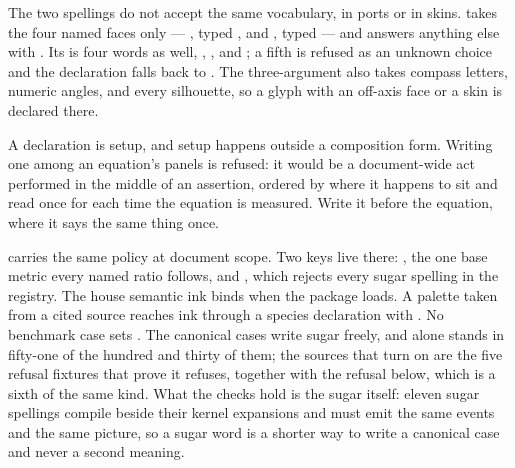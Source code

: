 \dbendpar The two spellings do not accept the same vocabulary, in ports
or in skins.   takes the four named faces only ---
,  typed , and ,
 typed  --- and answers anything else with
.  Its  is four words as
well, , ,  and ; a fifth is
refused as an unknown choice and the declaration falls back to
.  The three-argument  also
takes compass letters, numeric angles, and every silhouette, so a glyph
with an off-axis face or a  skin is declared there.

A declaration is setup, and setup happens outside a composition form.
Writing one among an equation's panels is refused: it would be a
document-wide act performed in the middle of an assertion, ordered by
where it happens to sit and read once for each time the equation is
measured.  Write it before the equation, where it says the same thing
once.

 carries the same policy at document scope.  Two keys live
there: , the one base metric every named ratio follows, and
, which rejects every sugar spelling in the registry.  The
house semantic ink binds when the package loads.  A palette taken from a
cited source reaches ink through a species declaration with .
No benchmark case sets .  The canonical cases write sugar freely, and
 alone stands in fifty-one of the hundred and thirty of
them; the sources that turn  on are the five refusal
fixtures that prove it refuses, together with the refusal below, which is
a sixth of the same kind.
What the checks hold is the sugar itself: eleven sugar spellings compile
beside their kernel expansions and must emit the same events and the same
picture, so a sugar word is a shorter way to write a canonical case and
never a second meaning.

\begin{tnexample}[
  wide,
  formula={\langle A\rvert O\lvert A\rangle},
  caption={the sandwich sugar and its strict kernel spelling},
  index={Both panels draw the same ket--operator--bra stack.  The left uses
    the \tnkey{sandwich} preset.  In the locally strict panel on the right,
    the three rows are written explicitly and therefore need no sugar.},
  signature={kernel-boundary|signature=}]
\begin{tenkz}[sandwich, cols=1, bonds=none]
   
\end{tenkz}
\qquad
{
\begin{tenkz}[rows={ket,op,bra}, cols=1, bonds=none]
   
\end{tenkz}}
\end{tnexample}

